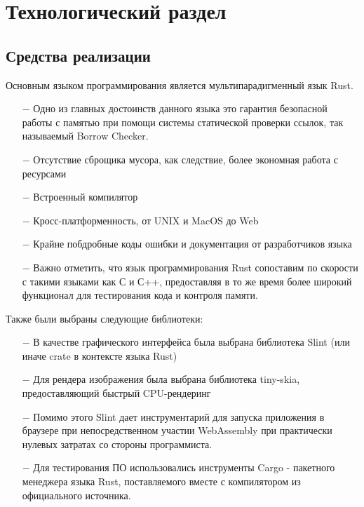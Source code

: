 \chapter{Технологический раздел}

\section{Средства реализации}

Основным языком программирования является мультипарадигменный язык Rust\cite{rust}.
\begin{itemize}
    \item[$-$] Одно из главных достоинств данного языка это гарантия безопасной работы с памятью при помощи системы
    статической проверки ссылок, так называемый Borrow Checker\cite{borrow-checker}.
    \item[$-$] Отсутствие сброщика мусора, как следствие, более экономная работа с ресурсами
    \item[$-$] Встроенный компилятор
    \item[$-$] Кросс-платформенность, от UNIX и MacOS до Web
    \item[$-$] Крайне побдробные коды ошибки и документация от разработчиков языка
    \item[$-$] Важно отметить, что язык программирования Rust сопоставим по скорости с такими языками как С и С++,
    предоставляя в то же время более широкий функционал для тестирования кода и контроля памяти.
\end{itemize}

Также были выбраны следующие библиотеки:
\begin{itemize}
    \item[$-$] В качестве графического интерфейса была выбрана библиотека Slint\cite{slint} (или иначе crate в контексте языка Rust)
    \item[$-$] Для рендера изображения была выбрана библиотека tiny-skia\cite{tiny-skia}, предоставляющий быстрый CPU-рендеринг
    \item[$-$] Помимо этого Slint дает инструментарий для запуска приложения в браузере при непосредственном участии WebAssembly при практически нулевых затратах со стороны программиста.
    \item[$-$] Для тестирования ПО использовались инструменты Cargo\cite{cargo} - пакетного менеджера языка Rust, поставляемого вместе с компилятором из официального источника.
\end{itemize}


